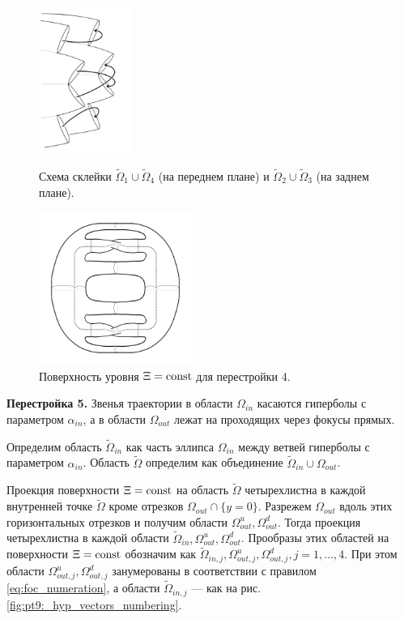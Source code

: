 \begin{figure}[!htb]
\centering
\includegraphics[width=3cm]{images/ch4/section2/atoms/atom_foc_hyp_iter1.pdf}
    \caption{Схема склейки $\widetilde{\Omega}_1 \cup \widetilde{\Omega}_4$ (на переднем плане) и $\widetilde{\Omega}_2 \cup \widetilde{\Omega}_3$ (на заднем плане).}
    \label{fig:pt9:_atom_foc_hyp_iter1}
    \endminipage\hfill
{}
    \centering
\includegraphics[width=5cm]{images/ch4/section2/atoms/atom_4.pdf}
    \caption{Поверхность уровня $\Xi = \mathrm{const}$ для перестройки 4.}
    \label{fig:pt9:_atom_4}
\endminipage\hfill
\end{figure}

\textbf{Перестройка 5.} 
Звенья траектории в области $\Omega_{in}$ касаются гиперболы с параметром $\alpha_{in}$, а в области $\Omega_{out}$ лежат на проходящих через фокусы прямых.

Определим область $\widetilde{\Omega}_{in}$ как часть эллипса $\Omega_{in}$ между ветвей гиперболы с параметром $\alpha_{in}$. 
Область $\widetilde{\Omega}$ определим как объединение $\widetilde{\Omega}_{in} \cup \Omega_{out}$.

Проекция поверхности $\Xi = \mathrm{const}$ на область $\widetilde{\Omega}$ четырехлистна в каждой внутренней точке $\widetilde{\Omega}$ кроме отрезков $\Omega_{out} \cap \{y=0\}$.
Разрежем $\Omega_{out}$ вдоль этих горизонтальных отрезков и получим области $\Omega_{out}^u,  \Omega_{out}^d$. 
Тогда проекция четырехлистна в каждой области $\widetilde{\Omega}_{in}, \Omega_{out}^u,  \Omega_{out}^d$. Прообразы этих областей на поверхности $\Xi = \mathrm{const}$  обозначим как $\widetilde{\Omega}_{in, j}, \Omega_{out, j}^u,  \Omega_{out, j}^d, j=1,\ldots, 4$. 
При этом области $\Omega_{out, j}^u,  \Omega_{out, j}^d$ занумерованы  в соответствии с правилом \eqref{eq:foc_numeration}, а области $\widetilde{\Omega}_{in, j}$ --- как на рис. \ref{fig:pt9:_hyp_vectors_numbering}.

